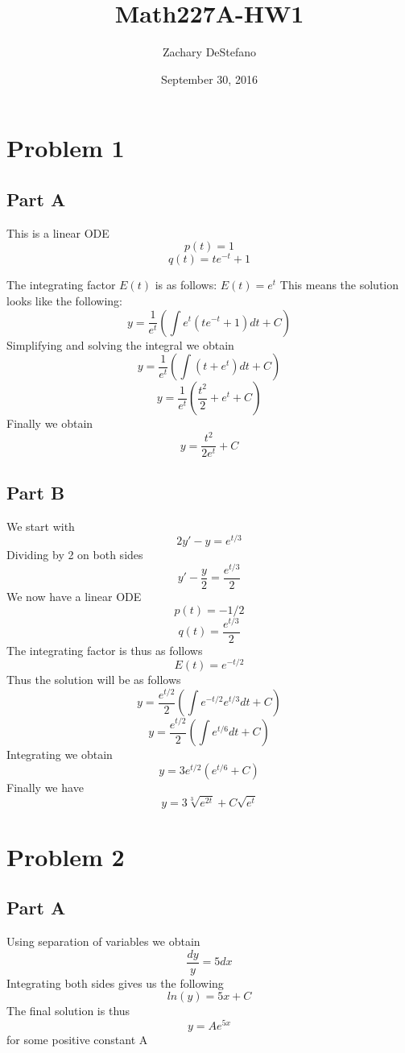 \documentclass{article}
\title{Math227A-HW1}
\author{Zachary DeStefano }
\date{September 30, 2016}
\begin{document}
\maketitle

\section{Problem 1}

\subsection{Part A}

This is a linear ODE
\[
p(t) = 1
\]
\[
q(t) = t e^{-t} + 1
\]

The integrating factor $E(t)$ is as follows: $E(t)=e^t$
This means the solution looks like the following:
\[
y = \frac{1}{e^t} ( \int e^t (t e^{-t} + 1) dt + C)
\]
Simplifying and solving the integral we obtain
\[
y = \frac{1}{e^t} (\int (t + e^t)dt + C)
\]
\[
y = \frac{1}{e^t} (\frac{t^2}{2} + e^t + C)
\]
Finally we obtain
\[
y = \frac{t^2}{2 e^t} + C
\]

\newpage

\subsection{Part B}

We start with
\[
2y' - y = e^{t/3}
\]
Dividing by 2 on both sides
\[
y' - \frac{y}{2} = \frac{e^{t/3}}{2}
\]
We now have a linear ODE
\[
p(t) = -1/2
\]
\[
q(t) = \frac{e^{t/3}}{2}
\]
The integrating factor is thus as follows
\[
E(t) = e^{-t/2}
\]
Thus the solution will be as follows
\[
y = \frac{e^{t/2}}{2} ( \int e^{-t/2}e^{t/3} dt + C)
\]
\[
y = \frac{e^{t/2}}{2} ( \int e^{t/6} dt + C)
\]
Integrating we obtain
\[
y = 3e^{t/2} ( e^{t/6} + C)
\]
Finally we have
\[
y = 3\sqrt[3]{e^{2t}} + C \sqrt{e^{t}}
\]

\newpage

\section{Problem 2}

\subsection{Part A}

Using separation of variables we obtain
\[
\frac{dy}{y} = 5dx
\]
Integrating both sides gives us the following
\[
ln(y) = 5x + C
\]
The final solution is thus
\[
y = A e^{5x}
\]
for some positive constant A
\end{document}
